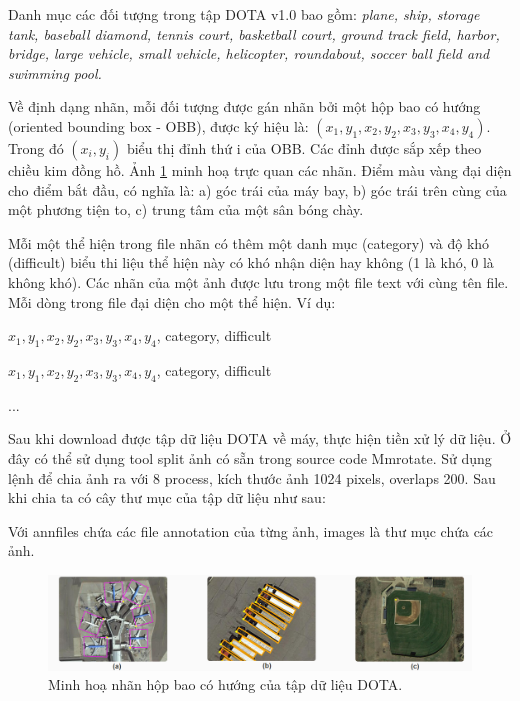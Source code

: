 \documentclass[12pt,a4paper,openany,oneside]{report}
\begin{document}
Danh mục các đối tượng trong tập DOTA v1.0 bao gồm: \textit{plane, ship, storage tank, baseball diamond, tennis court, basketball court, ground track field, harbor, bridge, large vehicle, small vehicle, helicopter, roundabout, soccer ball field and swimming pool.}

Về định dạng nhãn, mỗi đối tượng được gán nhãn bởi một hộp bao có hướng (oriented bounding box - OBB), được ký hiệu là: $(x_1, y_1, x_2, y_2, x_3, y_3, x_4, y_4)$. Trong đó $(x_i, y_i)$ biểu thị đỉnh thứ i của OBB. Các đỉnh được sắp xếp theo chiều kim đồng hồ. Ảnh \ref{minh_hoa_hop_bao_dota} minh hoạ trực quan các nhãn. Điểm màu vàng đại diện cho điểm bắt đầu, có nghĩa là: a) góc trái của máy bay, b) góc trái trên cùng của một phương tiện to, c) trung tâm của một sân bóng chày.

Mỗi một thể hiện trong file nhãn có thêm một danh mục (category) và độ khó (difficult) biểu thi liệu thể hiện này có khó nhận diện hay không (1 là khó, 0 là không khó). Các nhãn của một ảnh được lưu trong một file text với cùng tên file. Mỗi dòng trong file đại diện cho một thể hiện. Ví dụ:

$x_1, y_1, x_2, y_2, x_3, y_3, x_4, y_4$, category, difficult 

$x_1, y_1, x_2, y_2, x_3, y_3, x_4, y_4$, category, difficult 

...

Sau khi download được tập dữ liệu DOTA về máy, thực hiện tiền xử lý dữ liệu. Ở đây có thể sử dụng tool split ảnh có sẵn trong source code Mmrotate. Sử dụng lệnh để chia ảnh ra với 8 process, kích thước ảnh 1024 pixels, overlaps 200. Sau khi chia ta có cây thư mục của tập dữ liệu như sau:\\


Với annfiles chứa các file annotation của từng ảnh, images là thư mục chứa các ảnh.
\begin{figure}[ht!]
	\begin{center}
		\includegraphics[width=445px]{./minh_hoa_hop_bao_dota.jpg}
		\caption{Minh hoạ nhãn hộp bao có hướng của tập dữ liệu DOTA.}
		\label{minh_hoa_hop_bao_dota}
	\end{center}
\end{figure} 
\end{document}
